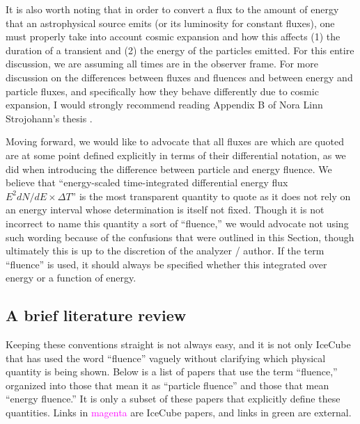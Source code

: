 \documentclass[a4paper,11pt]{article}
\begin{document}
It is also worth noting that in order to convert a flux to the amount of energy that an astrophysical source emits (or its luminosity for constant fluxes), one must properly take into account cosmic expansion and how this affects (1) the duration of a transient and (2) the energy of the particles emitted. For this entire discussion, we are assuming all times are in the observer frame. For more discussion on the differences between fluxes and fluences and between energy and particle fluxes, and specifically how they behave differently due to cosmic expansion, I would strongly recommend reading Appendix B of Nora Linn Strojohann's thesis \cite{norathesis}.

Moving forward, we would like to advocate that all fluxes are which are quoted are at some point defined explicitly in terms of their differential notation, as we did when introducing the difference between particle and energy fluence. We believe that ``energy-scaled time-integrated differential energy flux $E^2dN/dE\times \Delta T $'' is the most transparent quantity to quote as it does not rely on an energy interval whose determination is itself not fixed. Though it is not incorrect to name this quantity a sort of ``fluence,'' we would advocate not using such wording because of the confusions that were outlined in this Section, though ultimately this is up to the discretion of the analyzer / author. If the term ``fluence'' is used, it should always be specified whether this integrated over energy or a function of energy.

\subsection{A brief literature review}
Keeping these conventions straight is not always easy, and it is not only IceCube that has used the word ``fluence'' vaguely without clarifying which physical quantity is being shown. Below is a list of papers that use the term ``fluence,'' organized into those that mean it as ``particle fluence'' and those that mean ``energy fluence.'' It is only a subset of these papers that explicitly define these quantities. Links in \textcolor{magenta}{magenta} are IceCube papers, and links in \textcolor{PineGreen}{green} are external. 
\end{document}
